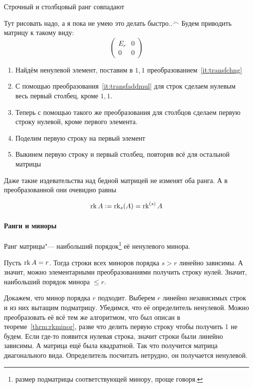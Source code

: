 \documentclass[12pt]{../../../notes}
\begin{document}
\begin{thrm}\label{thrm:rowrk=colrk}
  Строчный и столбцовый ранг совпадают
\end{thrm}
\begin{ittproof}
  Тут рисовать надо, а я пока не умею это делать быстро..$\ddot{\frown}$
  Будем приводить матрицу к такому виду:
  \[
    \left(
    \begin{array}{c|c}
      E_r & 0 \\ \hline
      0   & 0
    \end{array}
    \right)
  \]
  \begin{enumerate}
    \item Найдём ненулевой элемент, поставим в $1,1$ преобразованием~\ref{it:transfchng}
    \item С помощью преобразования~\ref{it:transfaddmul} для строк сделаем нулевым весь первый
      столбец, кроме $1,1$. 
    \item Теперь с помощью такого же преобразования для столбцов сделаем первую строку нулевой,
      кроме первого элемента.
    \item Поделим первую строку на первый элемент
    \item Выкинем первую строку и первый столбец, повторив всё для остальной матрицы
  \end{enumerate}
  Даже такие издевательства над бедной матрицей не изменят оба ранга.
  А в преобразованной они очевидно равны
\end{ittproof}

\begin{defn}\label{defn:mtxrank}
  \[
    \operatorname{rk} A := \operatorname{rk}_s (A) = \operatorname{rk}^{(s)} A
  \]
\end{defn}

\paragraph{Ранги и миноры}
\begin{thrm}\label{thrm:rkminor}
  Ранг матрицы"--- наибольший порядок\footnote{размер подматрицы соответствующей минору, проще
  говоря.} её ненулевого минора.
\end{thrm}
\begin{ittproof}
  Пусть $\operatorname{rk} A = r$. Тогда строки всех миноров порядка $s > r$ линейно зависимы. А значит, можно 
  элементарными преобразованиями получить строку нулей. Значит, наибольший порядок минора
  $\leqslant r$. 

  Докажем, что минор порядка $r$ подходит. Выберем $r$ линейно независимых строк и из них вытащим
  подматрицу. Убедимся, что её определитель ненулевой.
  Можно преобразовать её всё тем же алгоритмом, что был описан в теореме~\ref{thrm:rkminor},
  разве что делить первую строку чтобы получить 1 не будем.
  Если где-то появится нулевая строка, значит строки были линейно зависимы. А матрица ещё была
  квадратной. Так что получится матрица диагонального вида. Определитель посчитать нетрудно, он
  получается ненулевой.
\end{ittproof}
\end{document}

